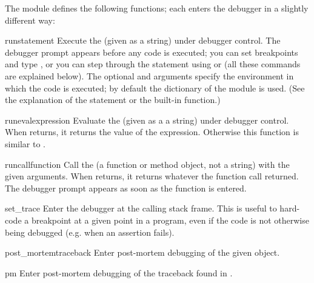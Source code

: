 The module defines the following functions; each enters the debugger
in a slightly different way:

\begin{funcdesc}{run}{statement}
Execute the  (given as a string) under debugger
control.  The debugger prompt appears before any code is executed; you
can set breakpoints and type , or you can step through
the statement using  or  (all these commands are
explained below).  The optional  and 
arguments specify the environment in which the code is executed; by
default the dictionary of the module  is used.  (See
the explanation of the  statement or the 
built-in function.)
\end{funcdesc}

\begin{funcdesc}{runeval}{expression}
Evaluate the  (given as a a string) under debugger
control.  When  returns, it returns the value of the
expression.  Otherwise this function is similar to
.
\end{funcdesc}

\begin{funcdesc}{runcall}{function}
Call the  (a function or method object, not a string)
with the given arguments.  When  returns, it returns
whatever the function call returned.  The debugger prompt appears as
soon as the function is entered.
\end{funcdesc}

\begin{funcdesc}{set_trace}{}
Enter the debugger at the calling stack frame.  This is useful to
hard-code a breakpoint at a given point in a program, even if the code
is not otherwise being debugged (e.g. when an assertion fails).
\end{funcdesc}

\begin{funcdesc}{post_mortem}{traceback}
Enter post-mortem debugging of the given  object.
\end{funcdesc}

\begin{funcdesc}{pm}{}
Enter post-mortem debugging of the traceback found in
.
\end{funcdesc}

